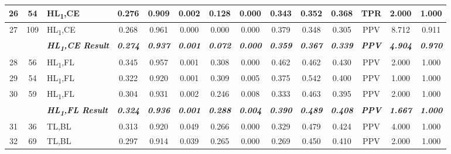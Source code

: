 \begin{table}[H]
{\begin{tabular}{cc|l|c|c|c|c|c|c|c|c|c|c|c|}
  \multicolumn{1}{|c|}{26} &
    54 &
    HL\textsubscript{1},CE &
    0.276 &
    0.909 &
    0.002 &
    0.128 &
    0.000 &
    0.343 &
    0.352 &
    0.368 &
    TPR &
    2.000 &
    1.000 \\ \hline
  \multicolumn{1}{|c|}{27} &
    109 &
    HL\textsubscript{1},CE &
    0.268 &
    0.961 &
    0.000 &
    0.000 &
    0.000 &
    0.379 &
    0.348 &
    0.305 &
    PPV &
    8.712 &
    0.911 \\ \hline
   &
    \textit{\textbf{}} &
    \textit{\textbf{HL\textsubscript{1},CE Result}} &
    \textit{\textbf{0.274}} &
    \textit{\textbf{0.937}} &
    \textit{\textbf{0.001}} &
    \textit{\textbf{0.072}} &
    \textit{\textbf{0.000}} &
    \textit{\textbf{0.359}} &
    \textit{\textbf{0.367}} &
    \textit{\textbf{0.339}} &
    \textit{\textbf{PPV}} &
    \textit{\textbf{4.904}} &
    \textit{\textbf{0.970}} \\ \hline
  \multicolumn{1}{|c|}{28} &
    56 &
    HL\textsubscript{1},FL &
    0.345 &
    0.957 &
    0.001 &
    0.308 &
    0.000 &
    0.462 &
    0.462 &
    0.430 &
    PPV &
    2.000 &
    1.000 \\ \hline
  \multicolumn{1}{|c|}{29} &
    54 &
    HL\textsubscript{1},FL &
    0.322 &
    0.920 &
    0.001 &
    0.309 &
    0.005 &
    0.375 &
    0.542 &
    0.400 &
    PPV &
    1.000 &
    1.000 \\ \hline
  \multicolumn{1}{|c|}{30} &
    59 &
    HL\textsubscript{1},FL &
    0.304 &
    0.931 &
    0.002 &
    0.246 &
    0.008 &
    0.333 &
    0.463 &
    0.395 &
    PPV &
    2.000 &
    1.000 \\ \hline
   &
    \textit{\textbf{}} &
    \textit{\textbf{HL\textsubscript{1},FL Result}} &
    \textit{\textbf{0.324}} &
    \textit{\textbf{0.936}} &
    \textit{\textbf{0.001}} &
    \textit{\textbf{0.288}} &
    \textit{\textbf{0.004}} &
    \textit{\textbf{0.390}} &
    \textit{\textbf{0.489}} &
    \textit{\textbf{0.408}} &
    \textit{\textbf{PPV}} &
    \textit{\textbf{1.667}} &
    \textit{\textbf{1.000}} \\ \hline
  \multicolumn{1}{|c|}{31} &
    36 &
    TL,BL &
    0.313 &
    0.920 &
    0.049 &
    0.266 &
    0.000 &
    0.329 &
    0.479 &
    0.424 &
    PPV &
    4.000 &
    1.000 \\ \hline
  \multicolumn{1}{|c|}{32} &
    69 &
    TL,BL &
    0.297 &
    0.914 &
    0.039 &
    0.265 &
    0.000 &
    0.269 &
    0.450 &
    0.410 &
    PPV &
    2.000 &
    1.000 \\ \hline

\end{tabular}}
\end{table}
